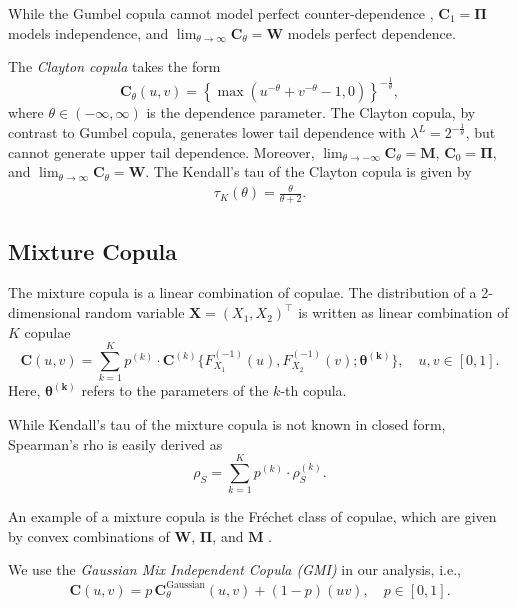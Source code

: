 \documentclass[11pt,a4paper,english]{article}
\begin{document}
While the Gumbel copula cannot model perfect counter-dependence
\citep{Nelsen2002}, $\bm{C}_{1} = \bm{\Pi}$ models independence, 
and $\lim_{\theta\rightarrow\infty} \bm{C}_\theta = \bm{W}$ models
perfect dependence. 


The {\em Clayton copula\/} takes the form
\begin{equation*}
  \bm{C}_{\theta}(u,v) = \left\{
    \max(u^{-\theta}+v^{-\theta}-1,0)\right\}^{-\frac{1}{\theta}},
\end{equation*}
where $\theta \in (-\infty, \infty)$ is the dependence parameter.
The Clayton copula, by contrast to Gumbel copula,
generates lower tail dependence with $\lambda^L =
2^{-\frac{1}{\theta}}$, but cannot generate upper tail dependence.
Moreover, $\lim_{\theta\rightarrow -\infty} \bm{C}_\theta = \bm{M}$, $\bm{C}_0 =
\bm{\Pi}$, and $\lim_{\theta\rightarrow\infty} \bm{C}_\theta = \bm{W}$. 
The Kendall's tau of the Clayton copula is given by 
\begin{align*}
    \tau_K(\theta) =\frac{\theta}{\theta+2}.
    \end{align*}

\subsection{Mixture Copula}\label{sec:mixture-copula}
The mixture copula is a linear combination of copulae. 
The distribution of a 2-dimensional random variable
$\bm{X}=(X_1,X_2)^\top$ is written as linear combination of $K$
copulae 
\begin{equation*} 
    \bm{C}(u,v)= \sum_{k=1}^K p^{(k)} \cdot \bm{C}^{(k)}\{F^{(-1)}_{X_1}(u),
    F^{(-1)}_{X_2}(v); \bm{\theta^{(k)}}\}, \quad u,v\in [0,1].
  \end{equation*}
  Here, $\bm{\theta^{(k)}}$ refers to the parameters of the
    $k$-th copula.
   
While Kendall's tau of the mixture copula is not known in closed form,
Spearman's rho is easily derived as 
\begin{equation*}
  \rho_S = \sum_{k=1}^K p^{(k)} \cdot \rho_S^{(k)}. 
\end{equation*}

An example of a mixture copula is the Fr\'echet class of copulae, which
are given by convex combinations of $\bm{W}$, $\bm{\Pi}$, and $\bm{M}$
\citep{Nelsen1999}.  

We use the {\em Gaussian Mix Independent Copula (GMI)} in our analysis,
i.e., 
\begin{equation*}
  \bm{C}(u,v) = p\, \bm{C}^\text{Gaussian}_\theta (u,v) + (1-p)(uv),\quad p\in [0,1].
\end{equation*}
\end{document}
